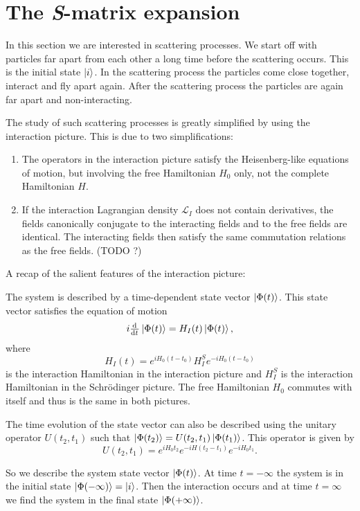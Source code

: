 \section{The \textit{S}-matrix expansion}
In this section we are interested in scattering processes. We start off with particles far apart from each other a long time before the scattering occurs. This is the initial state $\left| i \right\rangle$. In the scattering process the particles come close together, interact and fly apart again. After the scattering process the particles are again far apart and non-interacting.

The study of such scattering processes is greatly simplified by using the interaction picture. This is due to two simplifications:
\begin{enumerate}
\item The operators in the interaction picture satisfy the Heisenberg-like equations of motion, but involving the free Hamiltonian $H_0$ only, not the complete Hamiltonian $H$. 
\item If the interaction Lagrangian density $\mathcal{L} _I$ does not contain derivatives, the fields canonically conjugate to the interacting fields and to the free fields are identical. The interacting fields then satisfy the same commutation relations as the free fields. (TODO ?)
\end{enumerate}

\begin{note}
A recap of the salient features of the interaction picture:

The system is described by a time-dependent state vector $\left| \Phi(t) \right\rangle$. This state vector satisfies the equation of motion
\[ i \od{}{t}\ket{\Phi(t)} = H_I(t) \ket{\Phi(t)}, \]
where
\[ H_I(t) = e^{iH_0(t-t_0)}H_I^Se^{-iH_0(t-t_0)} \]
is the interaction Hamiltonian in the interaction picture and $H_I^S$ is the interaction Hamiltonian in the Schrödinger picture. The free Hamiltonian $H_0$ commutes with itself and thus is the same in both pictures.

The time evolution of the state vector can also be described using the unitary operator $U(t_2, t_1)$ such that $\left| \Phi(t_2) \right\rangle = U(t_2, t_1)\left| \Phi(t_1) \right\rangle$. This operator is given by
\[ U(t_2, t_1) = e^{iH_0t_2}e^{-iH(t_2-t_1)}e^{-iH_0t_1}. \]
\end{note}

So we describe the system state vector $\left| \Phi(t) \right\rangle$. At time $t= -\infty$ the system is in the initial state $\left| \Phi(-\infty) \right\rangle = \left| i \right\rangle$. Then the interaction occurs and at time $t=\infty$ we find the system in the final state $\left| \Phi(+\infty) \right\rangle$.

